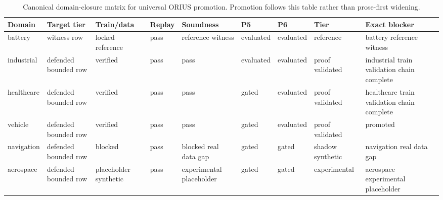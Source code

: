 \begin{table}[htbp]
\centering
\caption{Canonical domain-closure matrix for universal ORIUS promotion. Promotion follows this table rather than prose-first widening.}
\label{tab:domain-closure-matrix}
\begin{tabular}{p{1.5cm}p{1.8cm}p{1.7cm}p{1.2cm}p{1.5cm}p{1.1cm}p{1.1cm}p{1.4cm}p{2.3cm}}
\toprule
\textbf{Domain} & \textbf{Target tier} & \textbf{Train/data} & \textbf{Replay} & \textbf{Soundness} & \textbf{P5} & \textbf{P6} & \textbf{Tier} & \textbf{Exact blocker} \\
\midrule
battery & witness row & locked reference & pass & reference witness & evaluated & evaluated & reference & battery reference witness \\
industrial & defended bounded row & verified & pass & pass & evaluated & evaluated & proof validated & industrial train validation chain complete \\
healthcare & defended bounded row & verified & pass & pass & gated & evaluated & proof validated & healthcare train validation chain complete \\
vehicle & defended bounded row & verified & pass & pass & gated & evaluated & proof validated & promoted \\
navigation & defended bounded row & blocked & pass & blocked real data gap & gated & gated & shadow synthetic & navigation real data gap \\
aerospace & defended bounded row & placeholder synthetic & pass & experimental placeholder & gated & gated & experimental & aerospace experimental placeholder \\
\bottomrule
\end{tabular}
\end{table}
